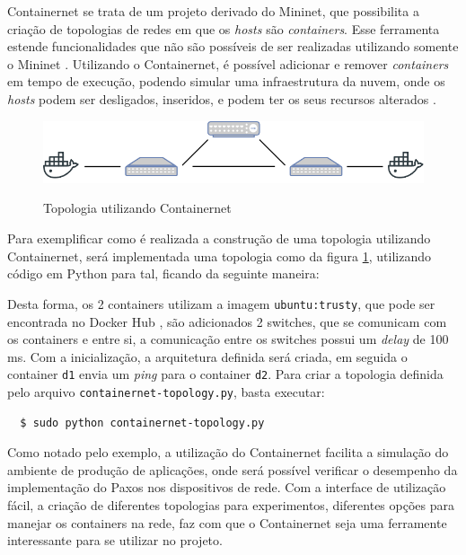 \documentclass[12pt,
openright, 
oneside,
a4paper,
brazil]{facom-ufu-abntex2}
\theoremstyle{definition}
\begin{document}
Containernet se trata de um projeto derivado do Mininet, que possibilita a criação de
topologias de redes em que os \textit{hosts} são \textit{containers}. Esse ferramenta estende 
funcionalidades que não são possíveis de ser realizadas utilizando somente o Mininet
\citep{mininetDocs}. Utilizando o Containernet, é possível adicionar e remover 
\textit{containers} em tempo de execução, podendo simular uma infraestrutura da nuvem, onde os 
\textit{hosts} podem ser desligados, inseridos, e podem ter os seus recursos alterados
\citep{peuster2016medicine}.

\begin{figure}[h]
    \caption{Topologia utilizando Containernet}
    \centering
    \includegraphics[width=\textwidth]{images/2d-2s-1c.png}
    \label{fig:containernet-topology-example}
\end{figure}

Para exemplificar como é realizada a construção de uma topologia utilizando Containernet, será
implementada uma topologia como da figura \ref{fig:containernet-topology-example}, utilizando
código em Python para tal, ficando da seguinte maneira:



Desta forma, os 2 containers utilizam a imagem \texttt{ubuntu:trusty}, que pode ser encontrada
no Docker Hub \citep{dockerHub}, são adicionados 2 switches, que se comunicam com os
containers e entre si, a comunicação entre os switches possui um \textit{delay} de 100 ms.
Com a inicialização, a arquitetura definida será criada, em seguida o container \texttt{d1} envia um
\textit{ping} para o container \texttt{d2}. Para criar a topologia definida pelo arquivo 
\texttt{containernet-topology.py}, basta executar:

\begin{verbatim}
  $ sudo python containernet-topology.py
\end{verbatim}

Como notado pelo exemplo, a utilização do Containernet facilita a simulação do ambiente de 
produção de aplicações, onde será possível verificar o desempenho da implementação do Paxos
nos dispositivos de rede. Com a interface de utilização fácil, a criação de diferentes 
topologias para experimentos, diferentes opções para manejar os containers na rede,
faz com que o Containernet seja uma ferramente interessante para se utilizar no projeto.
\end{document}
